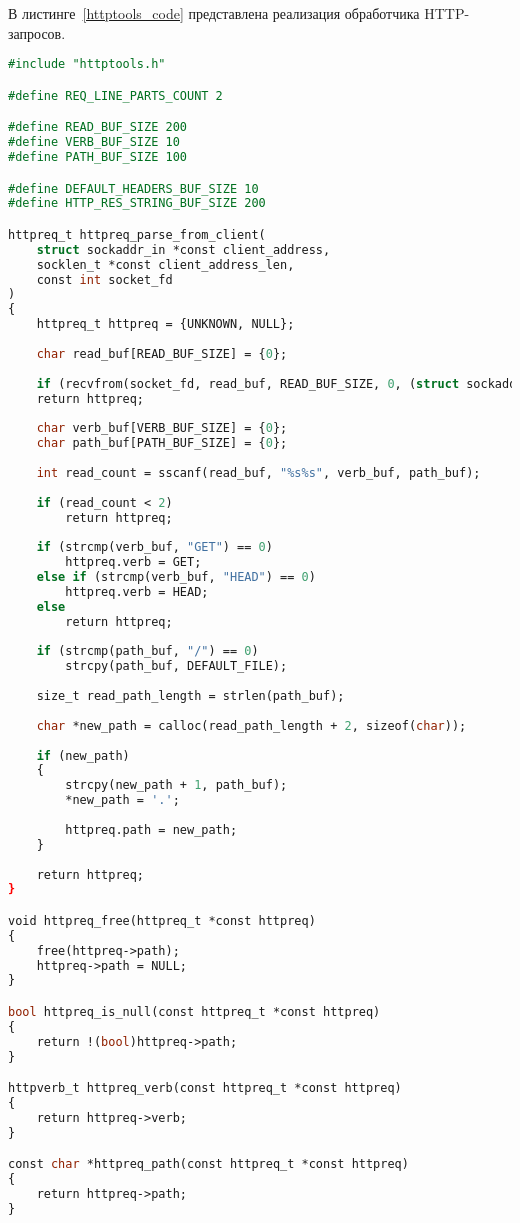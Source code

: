 В листинге~\ref{httptools_code} представлена реализация обработчика HTTP-запросов.
\begin{lstlisting}[label=httptools_code,caption=Реализация обработчика HTTP-запросов,language=Caml]
#include "httptools.h"

#define REQ_LINE_PARTS_COUNT 2

#define READ_BUF_SIZE 200
#define VERB_BUF_SIZE 10
#define PATH_BUF_SIZE 100

#define DEFAULT_HEADERS_BUF_SIZE 10
#define HTTP_RES_STRING_BUF_SIZE 200

httpreq_t httpreq_parse_from_client(
	struct sockaddr_in *const client_address,
	socklen_t *const client_address_len,
	const int socket_fd
)
{
	httpreq_t httpreq = {UNKNOWN, NULL};
	
	char read_buf[READ_BUF_SIZE] = {0};
	
	if (recvfrom(socket_fd, read_buf, READ_BUF_SIZE, 0, (struct sockaddr *)client_address, client_address_len) == -1)
	return httpreq;
	
	char verb_buf[VERB_BUF_SIZE] = {0};
	char path_buf[PATH_BUF_SIZE] = {0};
	
	int read_count = sscanf(read_buf, "%s%s", verb_buf, path_buf);
	
	if (read_count < 2)
		return httpreq;
	
	if (strcmp(verb_buf, "GET") == 0)
		httpreq.verb = GET;
	else if (strcmp(verb_buf, "HEAD") == 0)
		httpreq.verb = HEAD;
	else
		return httpreq;
	
	if (strcmp(path_buf, "/") == 0)
		strcpy(path_buf, DEFAULT_FILE);
	
	size_t read_path_length = strlen(path_buf);
	
	char *new_path = calloc(read_path_length + 2, sizeof(char));
	
	if (new_path)
	{
		strcpy(new_path + 1, path_buf);
		*new_path = '.';
		
		httpreq.path = new_path;
	}
	
	return httpreq;
}

void httpreq_free(httpreq_t *const httpreq)
{
	free(httpreq->path);
	httpreq->path = NULL;
}

bool httpreq_is_null(const httpreq_t *const httpreq)
{
	return !(bool)httpreq->path;
}

httpverb_t httpreq_verb(const httpreq_t *const httpreq)
{
	return httpreq->verb;
}

const char *httpreq_path(const httpreq_t *const httpreq)
{
	return httpreq->path;
}


\end{lstlisting}
